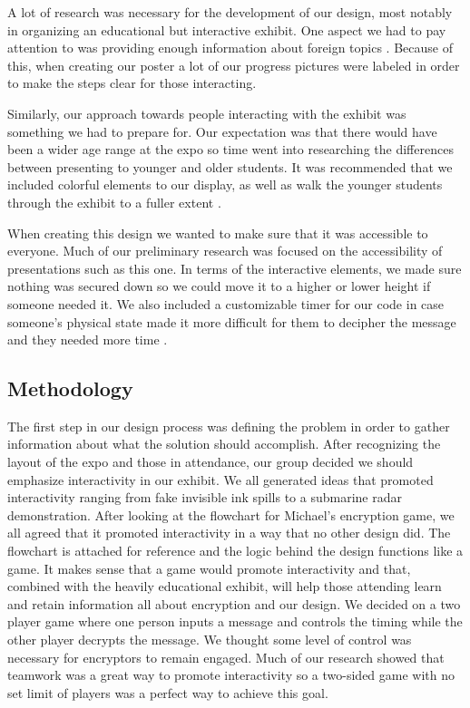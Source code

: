 \documentclass[conference]{IEEEtran}
\begin{document}
\par A lot of research was necessary for the development of our design, most notably in organizing an educational but interactive exhibit. One aspect we had to pay attention to was providing enough information about foreign topics \cite{b6}. Because of this, when creating our poster a lot of our progress pictures were labeled in order to make the steps clear for those interacting. 
\par Similarly, our approach towards people interacting with the exhibit was something we had to prepare for. Our expectation was that there would have been a wider age range at the expo so time went into researching the differences between presenting to younger and older students. It was recommended that we included colorful elements to our display, as well as walk the younger students through the exhibit to a fuller extent \cite{b16}.
\par When creating this design we wanted to make sure that it was accessible to everyone. Much of our preliminary research was focused on the accessibility of presentations such as this one. In terms of the interactive elements, we made sure nothing was secured down so we could move it to a higher or lower height if someone needed it. We also included a customizable timer for our code in case someone’s physical state made it more difficult for them to decipher the message and they needed more time \cite{b8}.

\subsection{Methodology}

The first step in our design process was defining the problem in order to gather information about what the solution should accomplish. After recognizing the layout of the expo and those in attendance, our group decided we should emphasize interactivity in our exhibit. We all generated ideas that promoted interactivity ranging from fake invisible ink spills to a submarine radar demonstration. After looking at the flowchart for Michael’s encryption game, we all agreed that it promoted interactivity in a way that no other design did. The flowchart is attached for reference and the logic behind the design functions like a game. It makes sense that a game would promote interactivity and that, combined with the heavily educational exhibit, will help those attending learn and retain information all about encryption and our design. We decided on a two player game where one person inputs a message and controls the timing while the other player decrypts the message. We thought some level of control was necessary for encryptors to remain engaged. Much of our research showed that teamwork was a great way to promote interactivity so a two-sided game with no set limit of players was a perfect way to achieve this goal. 
\end{document}
